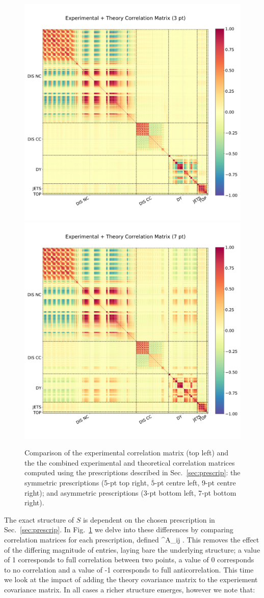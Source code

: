 \begin{figure}[H]
\begin{center}
\vskip-0.5cm
\includegraphics[width=0.49\linewidth]{mhous/plots/expth_corrmat_3pt.pdf}
    \includegraphics[width=0.49\linewidth]{mhous/plots/expth_corrmat_7pt.pdf}
    \caption{\small Comparison of the experimental correlation matrix (top left) and the
      the combined experimental and theoretical correlation matrices computed using the prescriptions described in Sec.~\ref{sec:prescrip}: the symmetric prescriptions (5-pt top right, $\overline{5}$-pt centre left, 9-pt centre right); and asymmetric prescriptions (3-pt bottom left, 7-pt bottom right).
  \label{fig:corrmats} }
  \end{center}
\end{figure}
The exact structure of $S$ is dependent on the chosen prescription in Sec.~\ref{sec:prescrip}. In Fig.~\ref{fig:corrmats} we delve into these differences by comparing correlation matrices for each prescription, defined
\be
{}^A_{ij} \equiv {}.
\ee
This removes the effect of the differing magnitude of entries, laying bare the underlying structure; a value of 1 corresponds to full correlation between two points, a value of 0 corresponds to no correlation and a value of -1 corresponds to full anticorrelation. This time we look at the impact of adding the theory covariance matrix to the experiement covariance matrix. In all cases a richer structure emerges, however we note that:
